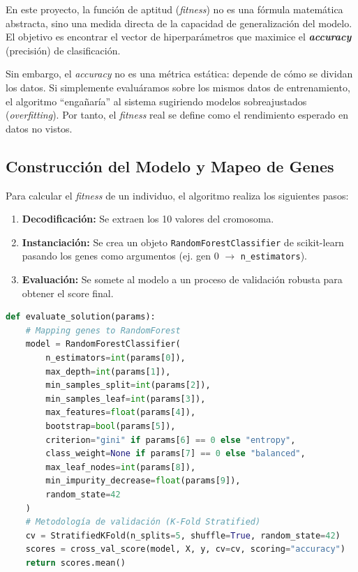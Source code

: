 \documentclass[12pt, a4paper]{article}
\begin{document}
En este proyecto, la función de aptitud (\textit{fitness}) no es una fórmula matemática
abstracta, sino una medida directa de la capacidad de generalización del modelo. El objetivo
es encontrar el vector de hiperparámetros que maximice el \textbf{\textit{accuracy}} (precisión)
de clasificación.

Sin embargo, el \textit{accuracy} no es una métrica estática: depende de cómo se dividan
los datos. Si simplemente evaluáramos sobre los mismos datos de entrenamiento, el
algoritmo ``engañaría'' al sistema sugiriendo modelos sobreajustados (\textit{overfitting}).
Por tanto, el \textit{fitness} real se define como el rendimiento esperado en datos
no vistos.

\subsection{Construcción del Modelo y Mapeo de Genes}

Para calcular el \textit{fitness} de un individuo, el algoritmo realiza los siguientes
pasos:
\begin{enumerate}[itemsep=0.2em]
  \item \textbf{Decodificación:} Se extraen los 10 valores del cromosoma.
  \item \textbf{Instanciación:} Se crea un objeto \texttt{RandomForestClassifier} de scikit-learn
        pasando los genes como argumentos (ej. gen 0 $\to$ \texttt{n\_estimators}).
  \item \textbf{Evaluación:} Se somete al modelo a un proceso de validación robusta para
        obtener el score final.
\end{enumerate}

\begin{lstlisting}[language=Python, caption={Cálculo del fitness mediante evaluación de modelo}]
def evaluate_solution(params):
    # Mapping genes to RandomForest
    model = RandomForestClassifier(
        n_estimators=int(params[0]),
        max_depth=int(params[1]),
        min_samples_split=int(params[2]),
        min_samples_leaf=int(params[3]),
        max_features=float(params[4]),
        bootstrap=bool(params[5]),
        criterion="gini" if params[6] == 0 else "entropy",
        class_weight=None if params[7] == 0 else "balanced",
        max_leaf_nodes=int(params[8]),
        min_impurity_decrease=float(params[9]),
        random_state=42
    )
    # Metodología de validación (K-Fold Stratified)
    cv = StratifiedKFold(n_splits=5, shuffle=True, random_state=42)
    scores = cross_val_score(model, X, y, cv=cv, scoring="accuracy")
    return scores.mean()
\end{lstlisting}
\end{document}
